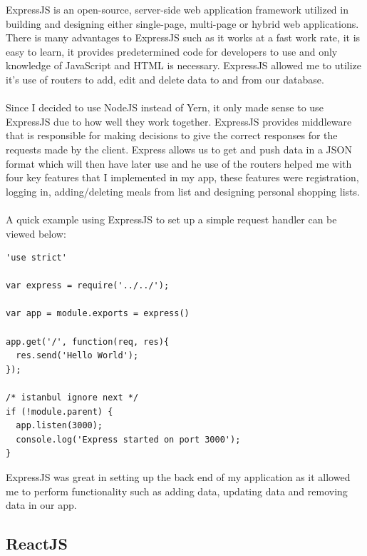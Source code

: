 ExpressJS is an open-source, server-side web application framework utilized in building and designing either single-page, multi-page or hybrid web applications. There is many advantages to ExpressJS such as it works at a fast work rate, it is easy to learn, it provides predetermined code for developers to use and only knowledge of JavaScript and HTML is necessary. ExpressJS allowed me to utilize it's use of routers to add, edit and delete data to and from our database. \\ \\
Since I decided to use NodeJS instead of Yern, it only made sense to use ExpressJS due to how well they work together. ExpressJS provides middleware that is responsible for making decisions to give the correct responses for the requests made by the client. Express allows us to get and push data in a JSON format which will then have later use and he use of the routers helped me with four key features that I implemented in my app, these features were registration, logging in, adding/deleting meals from list and designing personal shopping lists. \\ \\
A quick example using ExpressJS to set up a simple request handler can be viewed below:
\begin{verbatim}
'use strict'

var express = require('../../');

var app = module.exports = express()

app.get('/', function(req, res){
  res.send('Hello World');
});

/* istanbul ignore next */
if (!module.parent) {
  app.listen(3000);
  console.log('Express started on port 3000');
}
\end{verbatim}

ExpressJS was great in setting up the back end of my application as it allowed me to perform functionality such as adding data, updating data and removing data in our app.

\subsection{ReactJS}

